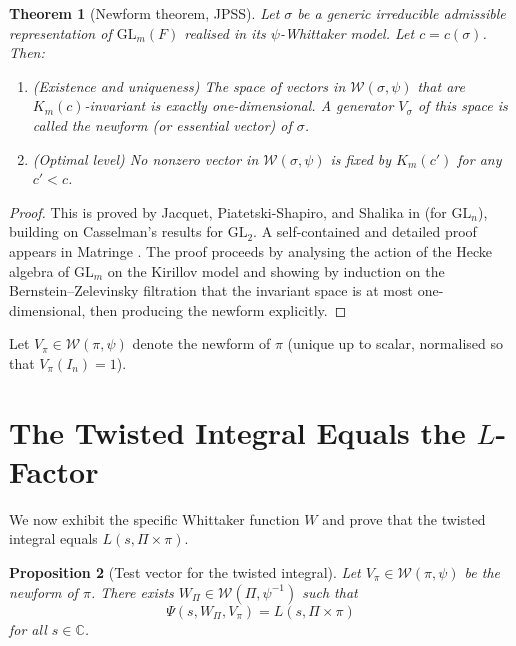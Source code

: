 \documentclass[12pt]{article}
\newtheorem{theorem}{Theorem}
\newtheorem{proposition}[theorem]{Proposition}
\begin{document}
\begin{theorem}[Newform theorem, JPSS]\label{thm:newform}
Let $\sigma$ be a generic irreducible admissible representation of $\mathrm{GL}_m(F)$
realised in its $\psi$-Whittaker model.  Let $c = c(\sigma)$.  Then:
\begin{enumerate}
\item \textup{(}Existence and uniqueness\textup{)} The space of vectors in
  $\mathcal{W}(\sigma,\psi)$ that are $K_m(c)$-invariant is exactly
  one-dimensional.  A generator $V_\sigma$ of this space is called the
  \emph{newform} \textup{(}or \emph{essential vector}\textup{)} of $\sigma$.
\item \textup{(}Optimal level\textup{)} No nonzero vector in $\mathcal{W}(\sigma,\psi)$
  is fixed by $K_m(c')$ for any $c' < c$.
\end{enumerate}
\end{theorem}

\begin{proof}
This is proved by Jacquet, Piatetski-Shapiro, and Shalika in \cite{JPSS81} (for
$\mathrm{GL}_n$), building on Casselman's results for $\mathrm{GL}_2$.  A
self-contained and detailed proof appears in Matringe \cite{Matringe13}.  The
proof proceeds by analysing the action of the Hecke algebra of $\mathrm{GL}_m$
on the Kirillov model and showing by induction on the Bernstein--Zelevinsky
filtration that the invariant space is at most one-dimensional, then producing
the newform explicitly.
\end{proof}

Let $V_\pi \in \mathcal{W}(\pi,\psi)$ denote the newform of $\pi$ (unique up to
scalar, normalised so that $V_\pi(I_n) = 1$).

\section{The Twisted Integral Equals the $L$-Factor}

We now exhibit the specific Whittaker function $W$ and prove that the twisted
integral equals $L(s,\Pi\times\pi)$.

\begin{proposition}[Test vector for the twisted integral]\label{prop:test}
Let $V_\pi \in \mathcal{W}(\pi,\psi)$ be the newform of $\pi$.  There exists
$W_\Pi \in \mathcal{W}(\Pi,\psi^{-1})$ such that
\begin{equation}\label{eq:test-vector-integral}
  \Psi(s, W_\Pi, V_\pi) = L(s, \Pi\times\pi)
\end{equation}
for all $s \in \mathbb{C}$.
\end{proposition}
\end{document}
